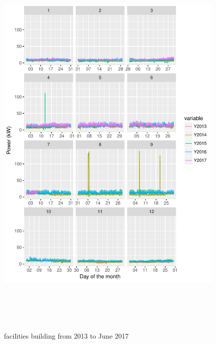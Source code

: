 \documentclass[11pt, oneside]{article}   	%
\begin{document}
\clearpage
\begin{figure}
\includegraphics[width=30cm,height=20cm,keepaspectratio]{facilities_build.pdf}
\caption{facilities building from  2013 to June 2017}
\end{figure}
\end{document}
